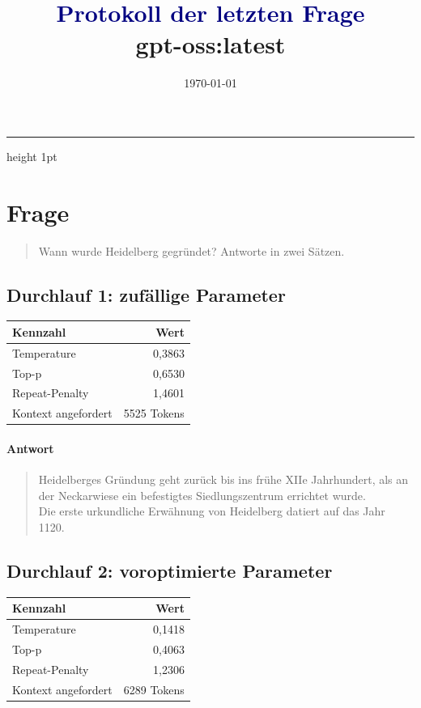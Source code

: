 \documentclass[11pt,a4paper]{article}
\title{\Huge \textbf{\textcolor{navy}{Protokoll der letzten Frage}}\\[0.3em]
\large \textcolor{accent}{gpt-oss:latest}}
\author{}
\date{\today}
\begin{document}
\maketitle
\thispagestyle{empty}
\thispagestyle{fancy}

\vspace{0.3cm}
\hrule height 1pt
\vspace{0.8cm}


\section*{Frage}

\begin{quote}
\raggedright
Wann wurde Heidelberg gegründet? Antworte in zwei Sätzen.
\end{quote}

\subsection*{Durchlauf 1: zufällige Parameter}

{\small
\begin{tabularx}{\textwidth}{Xr}
\toprule
\textbf{Kennzahl} & \textbf{Wert} \\
\midrule
Temperature & 0,3863 \\
Top-p & 0,6530 \\
Repeat-Penalty & 1,4601 \\
Kontext angefordert & 5525 Tokens \\
\bottomrule
\end{tabularx}
}
\paragraph{Antwort}
\begin{quote}
\raggedright
Heidelberges Gründung geht zurück bis ins frühe XIIe Jahrhundert, als an der Neckarwiese ein befestigtes Siedlungszentrum errichtet wurde.\\
Die erste urkundliche Erwähnung von Heidelberg datiert auf das Jahr 1120.
\end{quote}
\subsection*{Durchlauf 2: voroptimierte Parameter}

{\small
\begin{tabularx}{\textwidth}{Xr}
\toprule
\textbf{Kennzahl} & \textbf{Wert} \\
\midrule
Temperature & 0,1418 \\
Top-p & 0,4063 \\
Repeat-Penalty & 1,2306 \\
Kontext angefordert & 6289 Tokens \\
\bottomrule
\end{tabularx}
}
\end{document}
